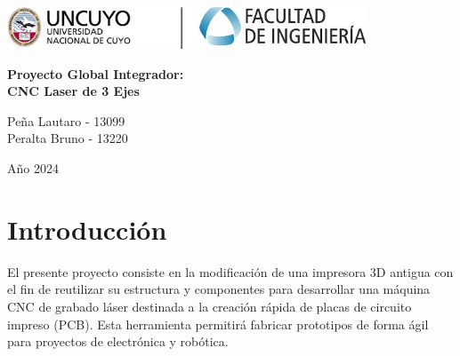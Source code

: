 
\setlength{\headheight}{16.9528pt}  %
\setlength{\headsep}{0.5cm}    %




\begin{titlepage}
    \centering

    \includegraphics[width=0.8\textwidth]{img/fing.jpeg}\par\vspace{1cm}
    \vspace{2cm}
    {\Huge \textbf{Proyecto Global Integrador:}\\[0.5cm]
    \textbf{CNC Laser de 3 Ejes}\vspace{2cm}}
    
    {\Large Peña Lautaro - 13099\\
    Peralta Bruno - 13220\par}\vspace{0.5cm}
    
    {Año 2024\par}
\end{titlepage}

\newpage
\tableofcontents
\newpage

\section{Introducción}

El presente proyecto consiste en la modificación de una impresora 3D antigua con el fin de reutilizar su estructura y componentes para desarrollar una máquina CNC de grabado láser destinada a la creación rápida de placas de circuito impreso (PCB). Esta herramienta permitirá fabricar prototipos de forma ágil para proyectos de electrónica y robótica.

